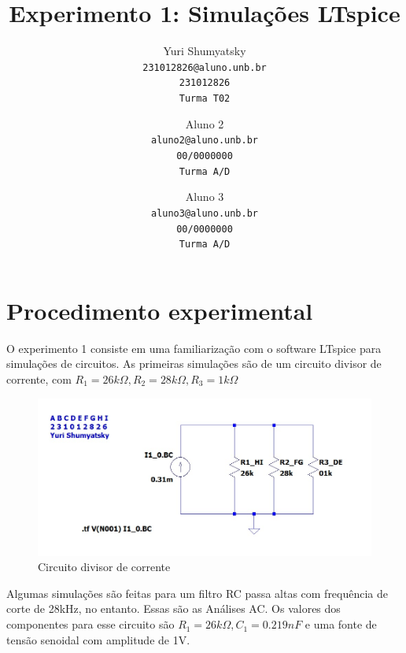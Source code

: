 \documentclass[10pt,twocolumn,letterpaper]{article}
\begin{document}
\title{Experimento 1: Simulações LTspice}

\author{Yuri Shumyatsky\\
{\tt\small 231012826@aluno.unb.br}\\
{\tt\small 231012826}\\
{\tt\small Turma T02}
\and
Aluno 2\\
{\tt\small aluno2@aluno.unb.br}\\
{\tt\small 00/0000000}\\
{\tt\small Turma A/D}
\and
Aluno 3\\
{\tt\small aluno3@aluno.unb.br}\\
{\tt\small 00/0000000}\\
{\tt\small Turma A/D}
}

\maketitle
\section{Procedimento experimental}

O experimento 1 consiste em uma familiarização com o software LTspice para simulações de circuitos. As primeiras simulações são de um circuito divisor de corrente, com $R_1 = 26k\Omega, R_2 = 28k\Omega, R_3 = 1k\Omega$

\begin{figure}[h]
\caption{Circuito divisor de corrente}
\includegraphics[scale=0.2]{figuras/fig1}
\end{figure}

Algumas simulações são feitas para um filtro RC passa altas com frequência de corte de 28kHz, no entanto. Essas são as Análises AC. Os valores dos componentes para esse circuito são $R_1=26k\Omega, C_1=0.219nF$ e uma fonte de tensão senoidal com amplitude de 1V.
\end{document}
